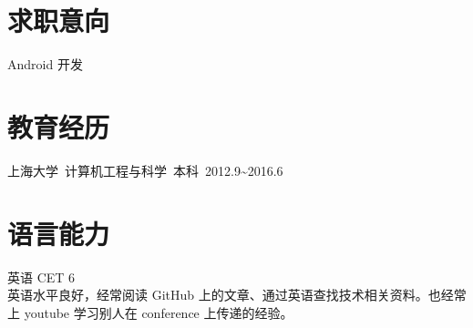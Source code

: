 \documentclass[11pt]{res}
\begin{document}
\address{  beatbox\_gao@hotmail.com\\ GitHub: \url{https://github.com/abcghy} \\ Blog: \url{http://abcghy.github.io}}
\address{上海杨浦 \\ 17602152878 18818217393}

\begin{resume}

\section{求职意向}
  Android 开发

\section{教育经历}
  上海大学\ 计算机工程与科学\ 本科\ 2012.9\~{}2016.6

\section{语言能力}
  英语 CET 6 \\英语水平良好，经常阅读 GitHub 上的文章、通过英语查找技术相关资料。也经常上 youtube 学习别人在 conference 上传递的经验。


\end{resume}
\end{document}
